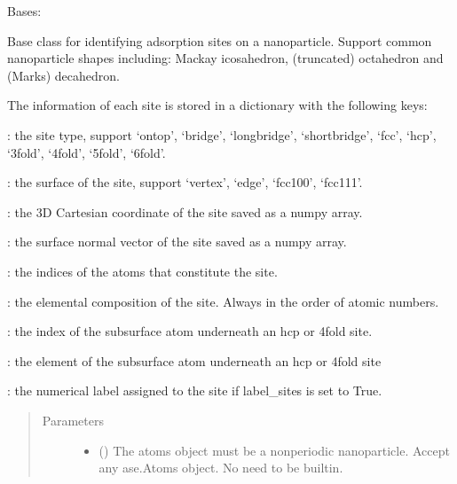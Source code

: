 \documentclass[letterpaper,10pt,english]{sphinxmanual}
\begin{document}
\begin{fulllineitems}
\label{\detokenize{modules:acat.adsorption_sites.ClusterAdsorptionSites}}
Bases: 

Base class for identifying adsorption sites on a nanoparticle.
Support common nanoparticle shapes including: Mackay icosahedron,
(truncated) octahedron and (Marks) decahedron.

The information of each site is stored in a dictionary with the
following keys:

: the site type, support ‘ontop’, ‘bridge’, ‘longbridge’,
‘shortbridge’, ‘fcc’, ‘hcp’, ‘3fold’, ‘4fold’, ‘5fold’, ‘6fold’.

: the surface of the site, support ‘vertex’, ‘edge’,
‘fcc100’, ‘fcc111’.

: the 3D Cartesian coordinate of the site saved as a
numpy array.

: the surface normal vector of the site saved as a numpy
array.

: the indices of the atoms that constitute the site.

: the elemental composition of the site. Always in
the order of atomic numbers.

: the index of the subsurface atom underneath an
hcp or 4fold site.

: the element of the subsurface atom underneath
an hcp or 4fold site

: the numerical label assigned to the site if label\_sites
is set to True.
\begin{quote}\begin{description}
\item[{Parameters}] \leavevmode\begin{itemize}
\item {} 
 () \textendash{} The atoms object must be a non\sphinxhyphen{}periodic nanoparticle.
Accept any ase.Atoms object. No need to be built\sphinxhyphen{}in.


\end{itemize}
\end{description}
\end{quote}
\end{fulllineitems}
\end{document}
